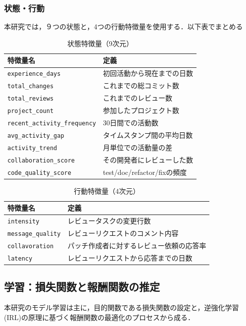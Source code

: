 \documentclass[submit,techrep,noauthor]{ipsj}
\begin{document}
\subsubsection{状態・行動}
本研究では，９つの状態と，4つの行動特徴量を使用する．以下表でまとめる
\begin{table}[h]
    \centering
    \caption{状態特徴量（9次元）}
    \begin{tabular}{@{}ll@{}}
        \toprule
        \textbf{特徴量名} & \textbf{定義} \\
        \midrule
        \texttt{experience\_days} & 初回活動から現在までの日数 \\
        \texttt{total\_changes} & これまでの総コミット数 \\
        \texttt{total\_reviews} & これまでのレビュー数 \\
        \texttt{project\_count} & 参加したプロジェクト数 \\
        \texttt{recent\_activity\_frequency} & 30日間での活動数 \\
        \texttt{avg\_activity\_gap} & タイムスタンプ間の平均日数 \\
        \texttt{activity\_trend} & 月単位での活動量の差\\
        \texttt{collaboration\_score} & その開発者にレビューした数 \\ 
        \texttt{code\_quality\_score} & test/doc/refactor/fixの頻度 \\
        \bottomrule
    \end{tabular}
\end{table}

\begin{table}[h]
    \centering
    \caption{行動特徴量（4次元）}
        \begin{tabular}{@{}ll@{}}
        \toprule
        \textbf{特徴量名} & \textbf{定義} \\
        \midrule
        \texttt{intensity} & レビュータスクの変更行数 \\
        \texttt{message\_quality} & レビューリクエストのコメント内容 \\
        \texttt{collavoration} & パッチ作成者に対するレビュー依頼の応答率 \\
        \texttt{latency} & レビューリクエストから応答までの日数 \\
        \bottomrule
    \end{tabular}
\end{table}


\subsection{学習：損失関数と報酬関数の推定}
本研究のモデル学習は主に，目的関数である損失関数の設定と，逆強化学習(IRL)の原理に基づく報酬関数の最適化のプロセスから成る．
\end{document}
